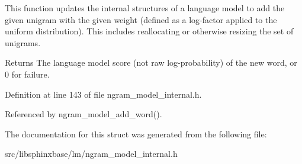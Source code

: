 This function updates the internal structures of a language model to add the given unigram with the given weight (defined as a log-\/factor applied to the uniform distribution). This includes reallocating or otherwise resizing the set of unigrams.

\begin{DoxyReturn}{Returns}
The language model score (not raw log-\/probability) of the new word, or 0 for failure. 
\end{DoxyReturn}


Definition at line 143 of file ngram\+\_\+model\+\_\+internal.\+h.



Referenced by ngram\+\_\+model\+\_\+add\+\_\+word().



The documentation for this struct was generated from the following file\+:\begin{DoxyCompactItemize}
\item 
src/libsphinxbase/lm/ngram\+\_\+model\+\_\+internal.\+h\end{DoxyCompactItemize}

